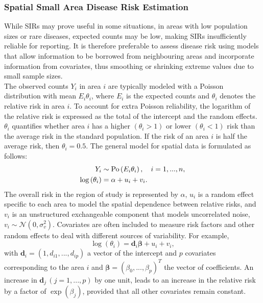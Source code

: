 \subsubsection{Spatial Small Area Disease Risk Estimation}
While SIRs may prove useful in some situations, in areas with low population sizes or rare diseases, expected counts may be low, making SIRs insufficiently reliable for reporting. It is therefore preferable to assess disease risk using models that allow information to be borrowed from neighbouring areas and incorporate information from covariates, thus smoothing or shrinking extreme values due to small sample sizes. \\
The observed counts $Y_i$ in area $i$ are typically modeled with a Poisson distribution with mean $E_i\theta_i$, where $E_i$ is the expected counts and $\theta_i$ denotes the relative risk in area $i$. To account for extra Poisson reliability, the logarithm of the relative risk is expressed as the total of the intercept and the random effects. $\theta_i$ quantifies whether area $i$ has a higher $\left(\theta_i >1\right)$ or lower $\left(\theta_i <1\right)$ risk than the average risk in the standard population. If the risk of an area $i$ is half the average risk, then $\theta_i = 0.5$. The general model for spatial data is formulated as follows:
\begin{align}
    Y_i&\sim\hbox{Po}\left(E_i\theta_i\right), \hspace{10pt} i=1,...,n,\\
    \log\left(\theta_i\right)&=\alpha+u_i+v_i.
\end{align}
The overall risk in the region of study is represented by $\alpha$, $u_i$ is a random effect specific to each area to model the spatial dependence between relative risks, and $v_i$ is an unstructured exchangeable component that models uncorrelated noise, $v_i\sim\mathcal{N}\left(0,\sigma_v^2\right)$. Covariates are often included to measure risk factors and other random effects to deal with different sources of variability. For example,
\begin{equation*}
    \log\left(\theta_i\right)=\pmb{d}_i\pmb{\beta}+u_i+v_i,
\end{equation*}
with $\pmb{d}_i = \left(1,d_{i1},...,d_{ip}\right)$ a vector of the intercept and $p$ covariates corresponding to the area $i$ and $\pmb{\beta}=\left(\beta_0,...,\beta_p\right)^T$ the vector of coefficients. An increase in $\pmb{d}_j\,\left(j = 1,...,p\right)$ by one unit, leads to an increase in the relative risk by a factor of $\exp\left(\beta_j\right)$, provided that all other covariates remain constant. \\
